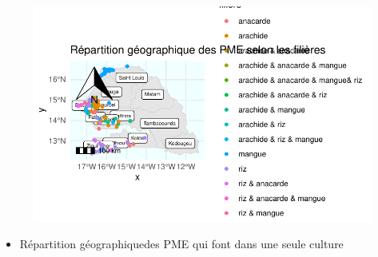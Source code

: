 \documentclass[
  letterpaper,
  DIV=11,
  numbers=noendperiod]{scrartcl}
\providecommand{\tightlist}{%
  \setlength{\itemsep}{0pt}\setlength{\parskip}{0pt}}\usepackage{longtable,booktabs,array}
\begin{document}
\begin{figure}[H]

{\centering \includegraphics{projet_R_files/figure-pdf/unnamed-chunk-41-1.pdf}

}

\end{figure}

\begin{itemize}
\tightlist
\item
  Répartition géographiquedes PME qui font dans une seule culture
\end{itemize}
\end{document}
